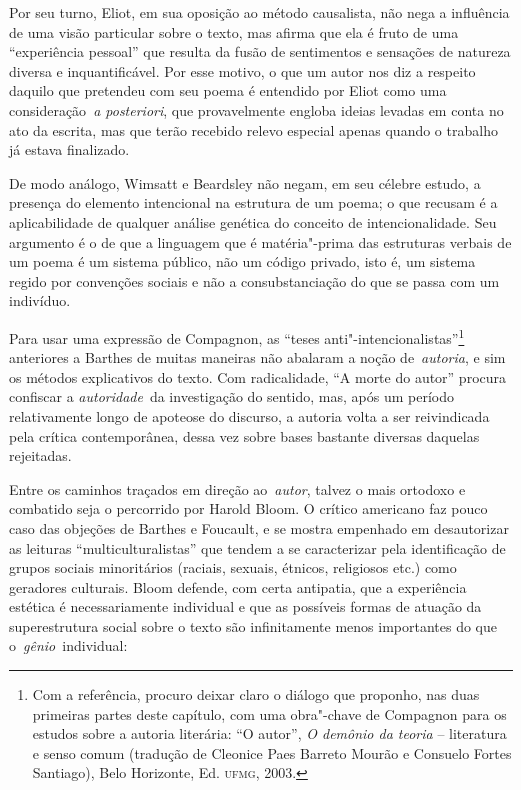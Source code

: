 Por seu turno, Eliot, em sua oposição ao método causalista, não nega a
influência de uma visão particular sobre o texto, mas afirma que ela é
fruto de uma ``experiência pessoal'' que resulta da fusão de sentimentos
e sensações de natureza diversa e inquantificável. Por esse motivo, o
que um autor nos diz a respeito daquilo que pretendeu com seu poema é
entendido por Eliot como uma consideração~\emph{a posteriori}, que
provavelmente engloba ideias levadas em conta no ato da escrita, mas que
terão recebido relevo especial apenas quando o trabalho já estava
finalizado.

De modo análogo, Wimsatt e Beardsley não negam, em seu célebre estudo, a
presença do elemento intencional na estrutura de um poema; o que recusam
é a aplicabilidade de qualquer análise genética do conceito de
intencionalidade. Seu argumento é o de que a linguagem que é
matéria"-prima das estruturas verbais de um poema é um sistema público,
não um código privado, isto é, um sistema regido por convenções sociais
e não a consubstanciação do que se passa com um indivíduo.

Para usar uma expressão de Compagnon, as ``teses
anti"-intencionalistas''\footnote{Com a referência, procuro deixar claro
  o diálogo que proponho, nas duas primeiras partes deste capítulo, com
  uma obra"-chave de Compagnon para os estudos sobre a autoria literária:
  ``O autor'', \emph{O demônio da teoria} -- literatura e senso comum
  (tradução de Cleonice Paes Barreto Mourão e Consuelo Fortes Santiago),
  Belo Horizonte, Ed. \textsc{ufmg}, 2003.} anteriores a Barthes de
muitas maneiras não abalaram a noção de~\emph{autoria}, e sim os métodos
explicativos do texto. Com radicalidade, ``A morte do autor'' procura
confiscar a \emph{autoridade}~da investigação do sentido, mas, após um
período relativamente longo de apoteose do discurso, a autoria volta a
ser reivindicada pela crítica contemporânea, dessa vez sobre bases
bastante diversas daquelas rejeitadas.

Entre os caminhos traçados em direção ao~\emph{autor}, talvez o mais
ortodoxo e combatido seja o percorrido por Harold Bloom. O crítico
americano faz pouco caso das objeções de Barthes e Foucault, e se mostra
empenhado em desautorizar as leituras ``multiculturalistas'' que tendem
a se caracterizar pela identificação de grupos sociais minoritários
(raciais, sexuais, étnicos, religiosos etc.) como geradores culturais.
Bloom defende, com certa antipatia, que a experiência estética é
necessariamente individual e que as possíveis formas de atuação da
superestrutura social sobre o texto são infinitamente menos importantes
do que o~\emph{gênio~}individual:

